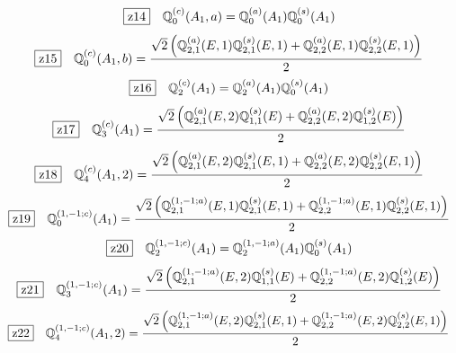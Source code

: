 \documentclass[fleqn,10pt,landscape]{jsarticle}
\begin{document}
\begin{dmath*}
\hspace*{3mm}\fbox{z14}\quad \mathbb{Q}_{0}^{(c)}(A_{1},a)=\mathbb{Q}_{0}^{(a)}(A_{1}) \mathbb{Q}_{0}^{(s)}(A_{1})
\end{dmath*}
\begin{dmath*}
\hspace*{3mm}\fbox{z15}\quad \mathbb{Q}_{0}^{(c)}(A_{1},b)=\frac{\sqrt{2} \left(\mathbb{Q}_{2,1}^{(a)}(E,1) \mathbb{Q}_{2,1}^{(s)}(E,1) + \mathbb{Q}_{2,2}^{(a)}(E,1) \mathbb{Q}_{2,2}^{(s)}(E,1)\right)}{2}
\end{dmath*}
\begin{dmath*}
\hspace*{3mm}\fbox{z16}\quad \mathbb{Q}_{2}^{(c)}(A_{1})=\mathbb{Q}_{2}^{(a)}(A_{1}) \mathbb{Q}_{0}^{(s)}(A_{1})
\end{dmath*}
\begin{dmath*}
\hspace*{3mm}\fbox{z17}\quad \mathbb{Q}_{3}^{(c)}(A_{1})=\frac{\sqrt{2} \left(\mathbb{Q}_{2,1}^{(a)}(E,2) \mathbb{Q}_{1,1}^{(s)}(E) + \mathbb{Q}_{2,2}^{(a)}(E,2) \mathbb{Q}_{1,2}^{(s)}(E)\right)}{2}
\end{dmath*}
\begin{dmath*}
\hspace*{3mm}\fbox{z18}\quad \mathbb{Q}_{4}^{(c)}(A_{1},2)=\frac{\sqrt{2} \left(\mathbb{Q}_{2,1}^{(a)}(E,2) \mathbb{Q}_{2,1}^{(s)}(E,1) + \mathbb{Q}_{2,2}^{(a)}(E,2) \mathbb{Q}_{2,2}^{(s)}(E,1)\right)}{2}
\end{dmath*}
\begin{dmath*}
\hspace*{3mm}\fbox{z19}\quad \mathbb{Q}_{0}^{(1,-1;c)}(A_{1})=\frac{\sqrt{2} \left(\mathbb{Q}_{2,1}^{(1,-1;a)}(E,1) \mathbb{Q}_{2,1}^{(s)}(E,1) + \mathbb{Q}_{2,2}^{(1,-1;a)}(E,1) \mathbb{Q}_{2,2}^{(s)}(E,1)\right)}{2}
\end{dmath*}
\begin{dmath*}
\hspace*{3mm}\fbox{z20}\quad \mathbb{Q}_{2}^{(1,-1;c)}(A_{1})=\mathbb{Q}_{2}^{(1,-1;a)}(A_{1}) \mathbb{Q}_{0}^{(s)}(A_{1})
\end{dmath*}
\begin{dmath*}
\hspace*{3mm}\fbox{z21}\quad \mathbb{Q}_{3}^{(1,-1;c)}(A_{1})=\frac{\sqrt{2} \left(\mathbb{Q}_{2,1}^{(1,-1;a)}(E,2) \mathbb{Q}_{1,1}^{(s)}(E) + \mathbb{Q}_{2,2}^{(1,-1;a)}(E,2) \mathbb{Q}_{1,2}^{(s)}(E)\right)}{2}
\end{dmath*}
\begin{dmath*}
\hspace*{3mm}\fbox{z22}\quad \mathbb{Q}_{4}^{(1,-1;c)}(A_{1},2)=\frac{\sqrt{2} \left(\mathbb{Q}_{2,1}^{(1,-1;a)}(E,2) \mathbb{Q}_{2,1}^{(s)}(E,1) + \mathbb{Q}_{2,2}^{(1,-1;a)}(E,2) \mathbb{Q}_{2,2}^{(s)}(E,1)\right)}{2}
\end{dmath*}
\end{document}
